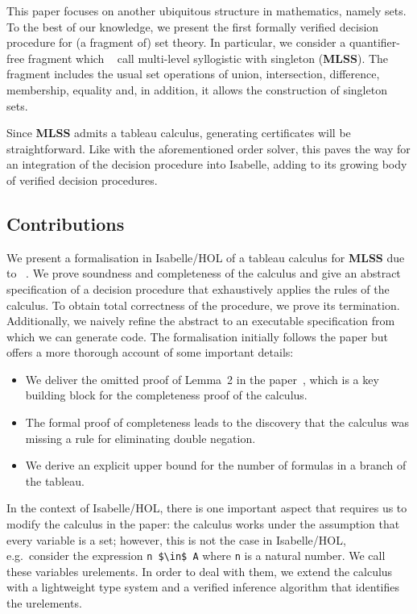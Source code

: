 \documentclass[runningheads]{llncs}
\newcommand{\MLSS}{\textbf{MLSS}}
\begin{document}
This paper focuses on another ubiquitous structure in mathematics, namely sets.
To the best of our knowledge, we present the first formally verified decision procedure for (a fragment of) set theory.
In particular, we consider a quantifier-free fragment which \citeauthor{new_fast_tableau}~\cite{new_fast_tableau} call multi-level syllogistic with singleton (\MLSS{}).
The fragment includes the usual set operations of union, intersection, difference, membership, equality and, in addition, it allows the construction of singleton sets.

Since \MLSS{} admits a tableau calculus, generating certificates will be straightforward.
Like with the aforementioned order solver, this paves the way for an integration of the decision procedure into Isabelle, adding to its growing body of verified decision procedures.

\subsection{Contributions}
We present a formalisation in Isabelle/HOL of a tableau calculus for \MLSS{} due to \citeauthor{new_fast_tableau}~\cite{new_fast_tableau}\cite[Chapter 14]{set_theory}.
We prove soundness and completeness of the calculus and give an abstract specification of a decision procedure that exhaustively applies the rules of the calculus.
To obtain total correctness of the procedure, we prove its termination.
Additionally, we naively refine the abstract to an executable specification from which we can generate code.
The formalisation initially follows the paper but offers a more thorough account of some important details:
\begin{itemize}
  \item We deliver the omitted proof of Lemma~2 in the paper~\cite{new_fast_tableau}, which is a key building block for the completeness proof of the calculus.
  \item The formal proof of completeness leads to the discovery that the calculus was missing a rule for eliminating double negation. 
  \item We derive an explicit upper bound for the number of formulas in a branch of the tableau.
\end{itemize}

In the context of Isabelle/HOL, there is one important aspect that requires us to modify the calculus in the paper:
the calculus works under the assumption that every variable is a set;
however, this is not the case in Isabelle/HOL, e.g.\ consider the expression \lstinline!n $\in$ A! where \lstinline!n! is a natural number.
We call these variables urelements.
In order to deal with them, we extend the calculus with a lightweight type system and a verified inference algorithm that identifies the urelements.
\end{document}

